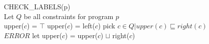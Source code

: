 \begin{algorithm}[h]
\SetAlgoNoEnd
CHECK\_LABELS(p)\\
  Let $Q$ be all constraints for program $p$\\

{
  {
    upper($c$) = $\top$
  }
  \Else
  {
    upper($c$) = left($c$)
  }
}
{
  pick $c \in Q | upper(c) \sqsubseteq right(c)$\\
  {
    $ERROR$
  }
  let upper($c$) = upper($c$) $\sqcup$ right($c$)
}

%
%
\end{algorithm}
